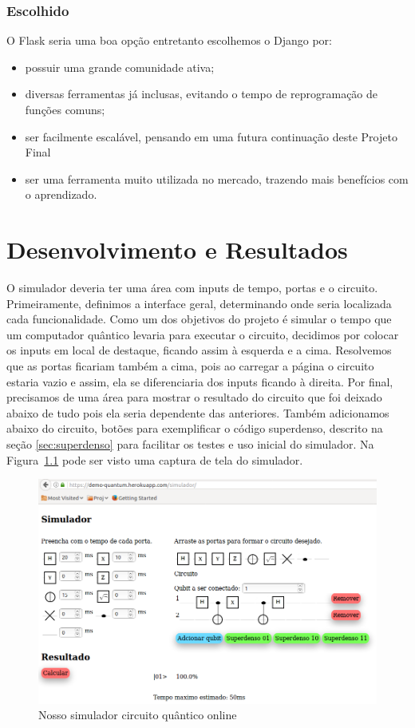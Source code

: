 \documentclass[a4paper, 12pt, oneside]{book}
\begin{document}
\subsection{Escolhido}
O Flask seria uma boa opção entretanto escolhemos o Django por:
\begin{itemize}
\item possuir uma grande comunidade ativa;
\item diversas ferramentas já inclusas, evitando o tempo de reprogramação de funções comuns;
\item ser facilmente escalável, pensando em uma futura continuação deste Projeto Final
\item ser uma ferramenta muito utilizada no mercado, trazendo mais benefícios com o aprendizado.
\end{itemize}


\chapter{Desenvolvimento e Resultados}
\thispagestyle{empty} 

O simulador deveria ter uma área com inputs de tempo, portas e o circuito. Primeiramente, definimos a interface geral, determinando onde seria localizada cada funcionalidade. Como um dos objetivos do projeto é simular o tempo que um computador quântico levaria para executar o circuito, decidimos por colocar os inputs em local de destaque, ficando assim à esquerda e a cima. Resolvemos que as portas ficariam também a cima, pois ao carregar a página o circuito estaria vazio e assim, ela se diferenciaria dos inputs ficando à direita. Por final, precisamos de uma área para mostrar o resultado do circuito que foi deixado abaixo de tudo pois ela seria dependente das anteriores. Também adicionamos abaixo do circuito, botões para exemplificar o código superdenso, descrito na seção \ref{sec:superdenso} para facilitar os testes e uso inicial do simulador. Na Figura~\ref{fig:simulador} pode ser visto uma captura de tela do simulador.

\begin{figure}[H]
\centering
\includegraphics[scale=0.5]{simulador-pagina.png}
\caption{Nosso simulador circuito quântico online}
\label{fig:simulador}
\end{figure}
\end{document}
